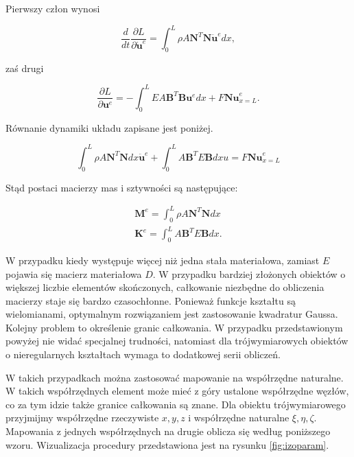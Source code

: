 Pierwszy człon wynosi

\begin{equation}
\frac{d}{dt} \frac{\partial L}{\partial \dot{\textbf{u}}^e} = \int_0^L \rho A {\textbf{N}}^T \textbf{N} {\ddot{\textbf{u}}}^e dx,
\end{equation}

zaś drugi

\begin{equation}
 \frac{\partial L}{\partial \textbf{u}^e} = -\int_0^L EA {\textbf{B}}^T \textbf{B} {\textbf{u}}^e dx + F \textbf{Nu}^e_{x=L}.
\end{equation}

Równanie dynamiki układu zapisane jest poniżej.

\begin{equation}
\int_0^L \rho A {\textbf{N}}^T \textbf{N} dx {\ddot{\textbf{u}}}^e + \int_0^L A {\textbf{B}}^T E \textbf{B} dx u = F \textbf{Nu}^e_{x=L}
\end{equation}

Stąd postaci macierzy mas i sztywności są następujące:

\begin{gather}
\textbf{M}^e = \int_0^L \rho A {\textbf{N}}^T \textbf{N} dx \\
\textbf{K}^e = \int_0^L A {\textbf{B}}^T E \textbf{B} dx.
\end{gather}

W przypadku kiedy występuje więcej niż jedna stała materiałowa, zamiast \( E \) pojawia się macierz materiałowa \( D \). W przypadku bardziej złożonych obiektów o większej liczbie elementów skończonych, całkowanie niezbędne do obliczenia macierzy staje się bardzo czasochłonne. Ponieważ funkcje kształtu są wielomianami, optymalnym rozwiązaniem jest zastosowanie kwadratur Gaussa. Kolejny problem to określenie granic całkowania. W przypadku przedstawionym powyżej nie widać specjalnej trudności, natomiast dla trójwymiarowych obiektów o nieregularnych kształtach wymaga to dodatkowej serii obliczeń.

W takich przypadkach można zastosować mapowanie na współrzędne naturalne. W takich współrzędnych element może mieć z góry ustalone współrzędne węzłów, co za tym idzie także granice całkowania są znane. Dla obiektu trójwymiarowego przyjmijmy współrzędne rzeczywiste \( x, y, z \) i współrzędne naturalne \( \xi, \eta, \zeta \). Mapowania z jednych współrzędnych na drugie oblicza się według poniższego wzoru. Wizualizacja procedury przedstawiona jest na rysunku \ref{fig:izoparam}.


